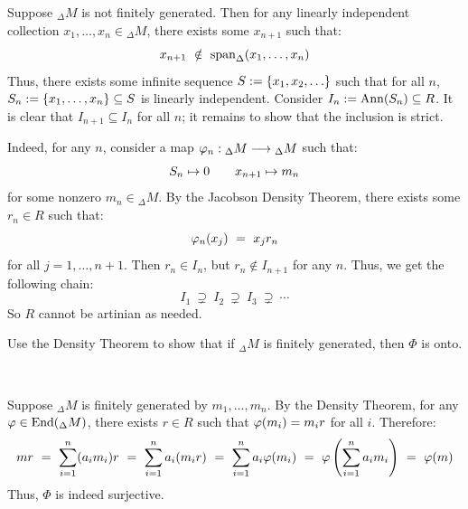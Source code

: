 \begin{pf}
	Suppose $_{\Delta}M$ is not finitely generated.
	Then for any linearly independent collection
	$x_{1},\dots,x_{n}\in{}_{\Delta}M$, there exists some $x_{n+1}$ such that:
	\begin{equation*}
		x_{n+1} \ \notin \ \trm{span}_{\Delta}(x_{1},\dots,x_{n})
	\end{equation*}
	Thus, there exists some infinite sequence $S:=\left\{{x_{1},x_{2},\dots}\right\}$
	such that for all $n$, $S_{n}:=\left\{{x_{1},\dots,x_{n}}\right\}\subseteq S$ is linearly
	independent.
	Consider $I_{n}:=\operatorname{Ann}(S_{n})\subseteq R$.
	It is clear that $I_{n+1}\subseteq I_{n}$ for all $n$;
	it remains to show that the inclusion is strict.

	Indeed, for any $n$, consider a map $\varphi_{n}:{}_{\Delta}M\longrightarrow{}_{\Delta}M$ such that:
	\begin{equation*}
		S_{n} \mapsto 0 \qquad x_{n+1} \mapsto m_{n}
	\end{equation*}
	for some nonzero $m_{n}\in{}_{\Delta}M$.
	By the Jacobson Density Theorem, there exists some $r_{n}\in R$ such that:
	\begin{equation*}
		\vphi_{n}(x_{j}) \ = \ x_{j}r_{n}
	\end{equation*}
	for all $j=1,\dots,n+1$.
	Then $r_{n}\in I_{n}$, but $r_{n}\notin I_{n+1}$ for any $n$.
	Thus, we get the following chain:
	\begin{equation*}
		I_{1} \ \supsetneq \ I_{2} \ \supsetneq \ I_{3} \ \supsetneq \ \cdots
	\end{equation*}
	So $R$ cannot be artinian as needed.
\end{pf}

\newpage
\begin{exr}[title=secretly corollary 11.17]
	Use the Density Theorem to show that if $_{\Delta}M$ is finitely generated,
	then $\Phi$ is onto. 
\end{exr} \

\begin{pf}
	Suppose $_{\Delta}M$ is finitely generated by $m_{1},\dots,m_{n}$.
	By the Density Theorem, for any $\varphi\in\operatorname{End}(_{\Delta}M)$,
	there exists $r\in R$ such that $\varphi(m_{i})=m_{i}r$ for all $i$. Therefore:
	\begin{equation*}
		mr
		\ = \ \sum_{i=1}^{n}(a_{i}m_{i})r
		\ = \ \sum_{i=1}^{n}a_{i}(m_{i}r)
		\ = \ \sum_{i=1}^{n}a_{i}\varphi(m_{i})
		\ = \ \varphi\left(\sum_{i=1}^{n}a_{i}m_{i}\right)
		\ = \ \varphi(m)
	\end{equation*}
	Thus, $\Phi$ is indeed surjective.
\end{pf} \

